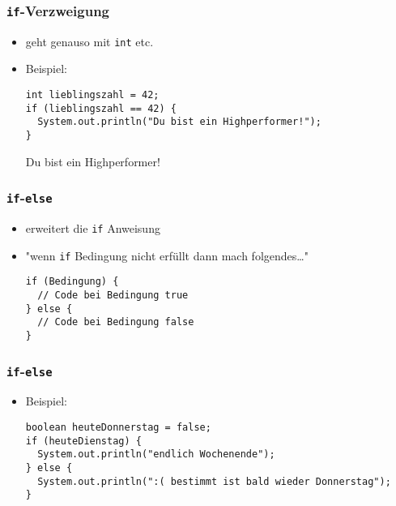 \documentclass{../../presentation}
\begin{document}
\begin{frame}[fragile]
  \frametitle{\texttt{if}-Verzweigung}

  \begin{itemize}
    \item<1-> geht genauso mit \texttt{int} etc.
    \item<2-> Beispiel:
          \begin{verbatim}
int lieblingszahl = 42;
if (lieblingszahl == 42) {
  System.out.println("Du bist ein Highperformer!");
}
      \end{verbatim}
          \begin{ausgabe}
            Du bist ein Highperformer!
          \end{ausgabe}
  \end{itemize}
\end{frame}



\begin{frame}[fragile]
  \frametitle{\texttt{if}-\texttt{else}}

  \begin{itemize}
    \item<1-> erweitert die \texttt{if} Anweisung
    \item<1-> "wenn \texttt{if} Bedingung nicht erfüllt dann mach folgendes\dots"
          \begin{verbatim}
if (Bedingung) {
  // Code bei Bedingung true
} else {
  // Code bei Bedingung false
}
\end{verbatim}
  \end{itemize}
\end{frame}

\begin{frame}[fragile]
  \frametitle{\texttt{if}-\texttt{else}}
  \begin{itemize}
    \item<1-> Beispiel:
          \begin{verbatim}
boolean heuteDonnerstag = false;
if (heuteDienstag) {
  System.out.println("endlich Wochenende");
} else {
  System.out.println(":( bestimmt ist bald wieder Donnerstag");
}
\end{verbatim}
  \end{itemize}
\end{frame}
\end{document}
